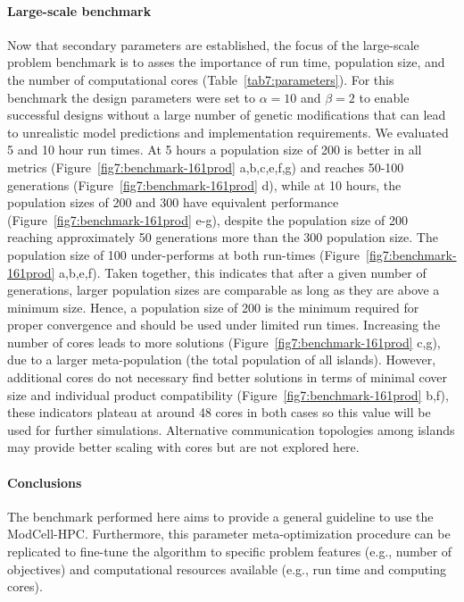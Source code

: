 {\paragraph{Large-scale benchmark}
Now that secondary parameters are established, the focus of the large-scale problem benchmark is to asses the importance of run time, population size, and the number of computational cores (Table~\ref{tab7:parameters}).
For this benchmark the design parameters were set to $\alpha=10$ and $\beta=2$ to enable successful designs without a large number of genetic modifications that can lead to unrealistic model predictions and implementation requirements.
We evaluated 5 and 10 hour run times. At 5 hours a population size of 200 is better in all metrics (Figure~\ref{fig7:benchmark-161prod} a,b,c,e,f,g) and reaches 50-100 generations (Figure~\ref{fig7:benchmark-161prod} d), while at 10 hours, the population sizes of 200 and 300 have equivalent performance (Figure~\ref{fig7:benchmark-161prod} e-g), despite the population size of 200 reaching  approximately 50 generations more than the 300 population size.
The population size of 100 under-performs at both run-times (Figure~\ref{fig7:benchmark-161prod} a,b,e,f).
Taken together, this indicates that after a given number of generations, larger population sizes are comparable as long as they are above a minimum size.
Hence, a population size of 200 is the minimum required for proper convergence and should be used under limited run times.
Increasing the number of cores leads to more solutions (Figure~\ref{fig7:benchmark-161prod} c,g), due to a larger meta-population (the total population of all islands). However, additional cores do not necessary find better solutions in terms of minimal cover size and individual product compatibility
(Figure~\ref{fig7:benchmark-161prod} b,f), these indicators plateau at around 48 cores in both cases so this value will be used for further simulations.
Alternative communication topologies among islands \citep{hijaze2009} may provide better scaling with cores but are not explored here.


\paragraph{Conclusions}
The benchmark performed here aims to provide a general guideline to use the ModCell-HPC. Furthermore, this parameter meta-optimization procedure can be replicated to fine-tune the algorithm to specific problem features (e.g., number of objectives) and computational resources available (e.g., run time and computing cores).

}
